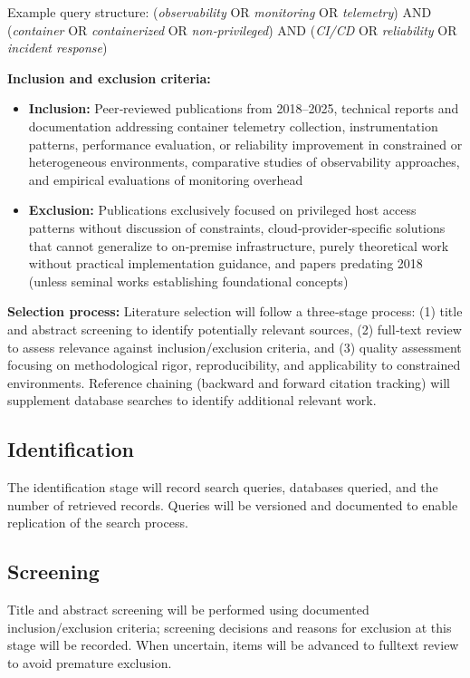 Example query structure: (\textit{observability} OR \textit{monitoring} OR \textit{telemetry}) AND (\textit{container} OR \textit{containerized} OR \textit{non‑privileged}) AND (\textit{CI/CD} OR \textit{reliability} OR \textit{incident response})

\textbf{Inclusion and exclusion criteria:}
\begin{itemize}
    \item \textbf{Inclusion:} Peer‑reviewed publications from 2018–2025, technical reports and documentation addressing container telemetry collection, instrumentation patterns, performance evaluation, or reliability improvement in constrained or heterogeneous environments, comparative studies of observability approaches, and empirical evaluations of monitoring overhead
    \item \textbf{Exclusion:} Publications exclusively focused on privileged host access patterns without discussion of constraints, cloud‑provider‑specific solutions that cannot generalize to on‑premise infrastructure, purely theoretical work without practical implementation guidance, and papers predating 2018 (unless seminal works establishing foundational concepts)
\end{itemize}

\textbf{Selection process:}
Literature selection will follow a three‑stage process: (1) title and abstract screening to identify potentially relevant sources, (2) full‑text review to assess relevance against inclusion/exclusion criteria, and (3) quality assessment focusing on methodological rigor, reproducibility, and applicability to constrained environments. Reference chaining (backward and forward citation tracking) will supplement database searches to identify additional relevant work.
\subsection{Identification}
The identification stage will record search queries, databases queried, and the number of retrieved records. Queries will be versioned and documented to enable replication of the search process.

\subsection{Screening}
Title and abstract screening will be performed using documented inclusion/exclusion criteria; screening decisions and reasons for exclusion at this stage will be recorded. When uncertain, items will be advanced to full\-text review to avoid premature exclusion.

